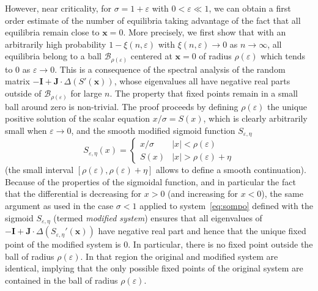 However, near criticality, for $\sigma=1+\varepsilon$ with $0<\varepsilon \ll 1$, we can obtain a first order estimate of the number of equilibria taking advantage of the fact that all equilibria remain close to ${\mathbf{x}}=0$. More precisely, we first show that with an arbitrarily high probability $1-\xi(n,\varepsilon)$ with $\xi(n,\varepsilon)\to 0$ as $n \to \infty$, all equilibria belong to a ball $\mathcal{B}_{\rho(\varepsilon)}$ centered at ${\mathbf{x}}=0$ of radius $\rho(\varepsilon)$ which tends to $0$ as $\varepsilon \to 0$. This is a consequence of the spectral analysis of the random matrix $-{\mathbf{I}}+{\mathbf{J}}\cdot \Delta(S'({\mathbf{x}}))$, whose eigenvalues all have negative real parts outside of $\mathcal{B}_{\rho(\varepsilon)}$ for large $n$. The property that fixed points remain in a small ball around zero is non-trivial. The proof proceeds by defining $\rho(\varepsilon)$ the unique positive solution of the scalar equation $x/\sigma=S(x)$, which is clearly arbitrarily small when $\varepsilon\to 0$, and the smooth modified sigmoid function $S_{\varepsilon,\eta}$ 
\[S_{\varepsilon,\eta}(x)=\begin{cases}
	x/\sigma & \vert x\vert <\rho(\varepsilon)\\
	S(x) & \vert x\vert >\rho(\varepsilon)+\eta
\end{cases}\] 
(the small interval $[\rho(\varepsilon),\rho(\varepsilon)+\eta]$ allows to define a smooth continuation). Because of the properties of the sigmoidal function, and in particular the fact that the differential is decreasing for $x>0$ (and increasing for $x<0$), the same argument as used in the case $\sigma<1$ applied to system~\eqref{eq:sompo} defined with the sigmoid $S_{\varepsilon,\eta}$ (termed \emph{modified system}) ensures that all eigenvalues of $-{\mathbf{I}}+{\mathbf{J}}\cdot \Delta(S_{\varepsilon,\eta}'({\mathbf{x}}))$ have negative real part and hence that the unique fixed point of the modified system is $0$. In particular, there is no fixed point outside the ball of radius $\rho(\varepsilon)$. In that region the original and modified system are identical, implying that the only possible fixed points of the original system are contained in the ball of radius $\rho(\varepsilon)$.

